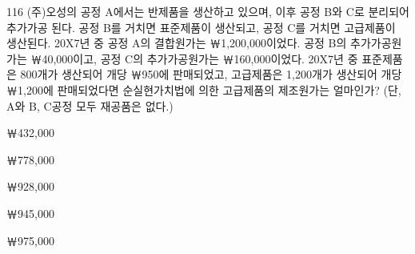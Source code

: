 \begin{question}{116}
(주)오성의 공정 A에서는 반제품을 생산하고 있으며, 이후 공정 B와 C로 분리되어 추가가공 된다. 공정 B를 거치면 표준제품이 생산되고, 공정 C를 거치면 고급제품이 생산된다. 20X7년 중 공정 A의 결합원가는 ￦1,200,000이었다. 공정 B의 추가가공원가는 ￦40,000이고, 공정 C의 추가가공원가는 ￦160,000이었다. 20X7년 중 표준제품은 800개가 생산되어 개당 ￦950에 판매되었고, 고급제품은 1,200개가 생산되어 개당 ￦1,200에 판매되었다면 순실현가치법에 의한 고급제품의 제조원가는 얼마인가? (단, A와 B, C공정 모두 재공품은 없다.)
\begin{choices}
  \item ￦432,000
  \item ￦778,000
  \item ￦928,000
  \item ￦945,000
  \item ￦975,000
\end{choices}
\end{question}
